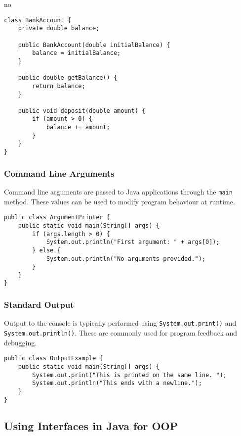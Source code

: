 no\documentclass{article}
\begin{document}
\begin{verbatim}
class BankAccount {
    private double balance;

    public BankAccount(double initialBalance) {
        balance = initialBalance;
    }

    public double getBalance() {
        return balance;
    }

    public void deposit(double amount) {
        if (amount > 0) {
            balance += amount;
        }
    }
}
\end{verbatim}

\subsubsection{Command Line Arguments}

Command line arguments are passed to Java applications through the \texttt{main} method. These values can be used to modify program behaviour at runtime.

\begin{verbatim}
public class ArgumentPrinter {
    public static void main(String[] args) {
        if (args.length > 0) {
            System.out.println("First argument: " + args[0]);
        } else {
            System.out.println("No arguments provided.");
        }
    }
}
\end{verbatim}

\subsubsection{Standard Output}

Output to the console is typically performed using \texttt{System.out.print()} and \texttt{System.out.println()}. These are commonly used for program feedback and debugging.

\begin{verbatim}
public class OutputExample {
    public static void main(String[] args) {
        System.out.print("This is printed on the same line. ");
        System.out.println("This ends with a newline.");
    }
}
\end{verbatim}


\subsection{Using Interfaces in Java for OOP}
\label{subsec:interfaces}
\end{document}
